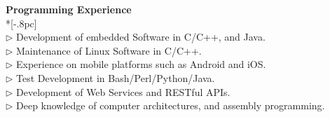 \documentclass[letter,11pt,english]{article}
\begin{document}
{\large \bf Programming Experience} \\*[-.8pc]
\underline{\hspace{6in}} \\
$\triangleright$ Development of embedded Software in C/C++, and Java.\\
$\triangleright$ Maintenance of Linux Software in C/C++.\\
$\triangleright$ Experience on mobile platforms such as Android and iOS.\\
$\triangleright$ Test Development in Bash/Perl/Python/Java.\\
$\triangleright$ Development of Web Services and RESTful APIs.\\
$\triangleright$ Deep knowledge of computer architectures, and assembly programming.\\
\end{document}

